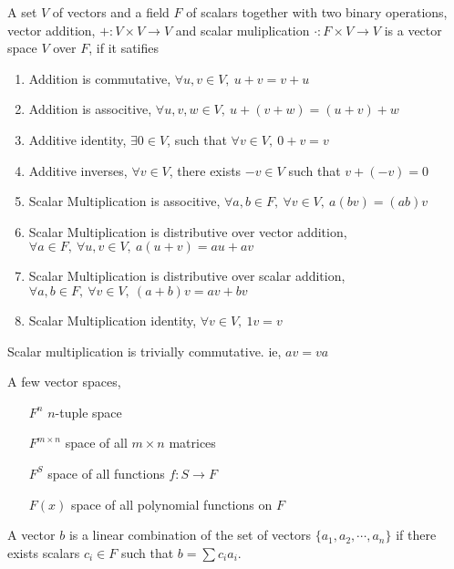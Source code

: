 	\begin{axiom}
		A set $V$ of vectors and a field $F$ of scalars together with two binary operations, vector addition, $+ : V \times V \to V$ and scalar muliplication $\cdot : F \times V \to V$ is a vector space $V$ over $F$, if it satifies
		\begin{enumerate}
			\item Addition is commutative, $\forall u,v \in V,\ u+v = v+u$
			\item Addition is associtive, $\forall u,v,w \in V,\ u+(v+w) = (u+v)+w$
			\item Additive identity, $\exists 0 \in V$, such that $\forall v \in V,\ 0+v = v$
			\item Additive inverses, $\forall v \in V$, there exists $-v \in V$ such that $v+(-v) = 0$
			\item Scalar Multiplication is associtive, $\forall a,b \in F,\ \forall v \in V,\ a(bv) = (ab)v$
			\item Scalar Multiplication is distributive over vector addition, $\forall a \in F,\ \forall u,v \in V,\ a(u+v) = au+av$
			\item Scalar Multiplication is distributive over scalar addition, $\forall a,b \in F,\ \forall v \in V,\ (a+b)v = av + bv$
			\item Scalar Multiplication identity, $\forall v \in V,\ 1v = v$
		\end{enumerate}
	\end{axiom}
	\begin{remark}
		Scalar multiplication is trivially commutative. ie, $av = va$
	\end{remark}
	\begin{remark}
		A few vector spaces,
		\begin{enumerate}
			\item[$F^n$] $n$-tuple space
			\item[$F^{m \times n}$] space of all $m \times n$ matrices
			\item[$F^S$] space of all functions $f : S \to F$
			\item[$F(x)$] space of all polynomial functions on $F$
		\end{enumerate}
	\end{remark}
	\begin{definition}
		A vector $b$ is a linear combination of	the set of vectors $\{ a_1, a_2, \cdots, a_n\}$ if there exists scalars $c_i \in F$ such that $b = \sum c_ia_i$.
	\end{definition}
